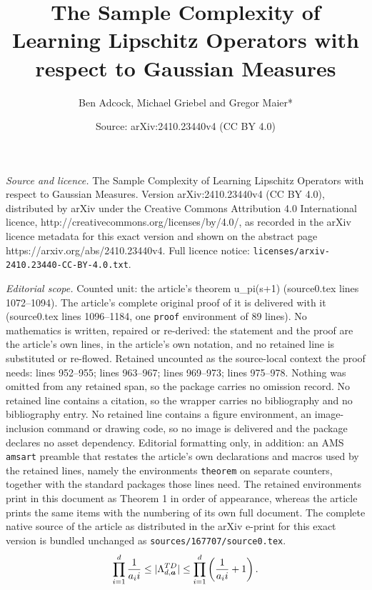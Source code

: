 \documentclass[10pt,a4paper]{amsart}
\title{The Sample Complexity of Learning Lipschitz Operators with respect to Gaussian Measures}
\author{Ben Adcock, Michael Griebel and Gregor Maier*}
\date{Source: arXiv:2410.23440v4 (CC BY 4.0)}
\newcommand{\absd}[1]{|#1|}    %
\begin{document}
\maketitle

\noindent\emph{Source and licence.} The Sample Complexity of Learning Lipschitz Operators with respect to Gaussian Measures. Version arXiv:2410.23440v4 (CC BY 4.0), distributed by arXiv under the Creative Commons Attribution 4.0 International licence, http://creativecommons.org/licenses/by/4.0/, as recorded in the arXiv licence metadata for this exact version and shown on the abstract page https://arxiv.org/abs/2410.23440v4. Full licence notice: \texttt{licenses/arxiv-2410.23440-CC-BY-4.0.txt}.\par\smallskip

\noindent\textit{Editorial scope.} Counted unit: the article's theorem u\_pi(s+1) (source0.tex lines 1072--1094). The article's complete original proof of it is delivered with it (source0.tex lines 1096--1184, one \texttt{proof} environment of 89 lines). No mathematics is written, repaired or re-derived: the statement and the proof are the article's own lines, in the article's own notation, and no retained line is substituted or re-flowed.  Retained uncounted as the source-local context the proof needs: lines 952--955; lines 963--967; lines 969--973; lines 975--978.  Nothing was omitted from any retained span, so the package carries no omission record.  No retained line contains a citation, so the wrapper carries no bibliography and no bibliography entry.  No retained line contains a figure environment, an image-inclusion command or drawing code, so no image is delivered and the package declares no asset dependency.  Editorial formatting only, in addition: an AMS \texttt{amsart} preamble that restates the article's own declarations and macros used by the retained lines, namely the environments \texttt{theorem} on separate counters, together with the standard packages those lines need.  The retained environments print in this document as Theorem 1 in order of appearance, whereas the article prints the same items with the numbering of its own full document.  The complete native source of the article as distributed in the arXiv e-print for this exact version is bundled unchanged as \texttt{sources/167707/source0.tex}.
    \begin{equation}
    \label{eq: anisotropic TD index set}
               \prod_{i=1}^d \frac{1}{a_i i} \leq \absd{\Lambda_{d,\bm{a}}^{\textup{TD}}} \leq \prod_{i=1}^d \left(\frac{1}{a_i i} + 1\right).
    \end{equation}
\end{document}
